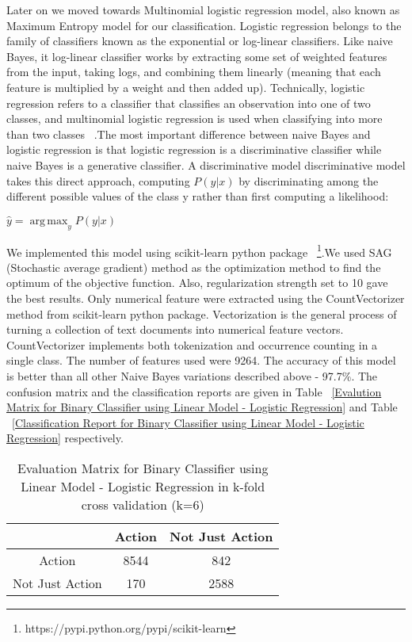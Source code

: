 \documentclass[11pt,letterpaper]{article}
\begin{document}
Later on we moved towards Multinomial logistic regression model, also known as Maximum Entropy model for our classification. Logistic regression belongs to the family of classifiers known as the exponential or log-linear classifiers. Like naive Bayes, it log-linear
classifier works by extracting some set of weighted features from the input, taking logs, and combining them linearly (meaning that each feature is multiplied by a weight and then added up). Technically, logistic regression refers to a classifier that classifies
an observation into one of two classes, and multinomial logistic regression is used when classifying into more than two classes ~\cite{jurafsky2000speech}.The most important difference between naive Bayes and logistic regression is that logistic regression is a discriminative classifier while naive Bayes is a generative
classifier.  A discriminative model discriminative
model takes this direct approach, computing $P(y|x)$ by discriminating among the different possible values of the class y rather than first computing a likelihood:

\begin{center}
 $\hat{y} = \operatorname*{arg\,max}_y P(y|x)$
\end{center}
We implemented this model using scikit-learn python package ~\footnote{https://pypi.python.org/pypi/scikit-learn}.We used SAG (Stochastic average gradient) method as the optimization method to find the optimum of the objective function. Also, regularization strength set to 10 gave the best results.  Only numerical feature were extracted using the CountVectorizer method from scikit-learn python package. Vectorization is the general process of turning a collection of text documents into numerical feature vectors. CountVectorizer implements both tokenization and occurrence counting in a single class. The number of features used were 9264. The accuracy of this model is better than all other Naive Bayes variations described above - 97.7\%. The confusion matrix and the classification reports are given in Table ~\ref{Evalution Matrix for Binary Classifier using  Linear Model - Logistic Regression} and Table ~\ref{Classification Report for Binary Classifier using  Linear Model - Logistic Regression} respectively.

\begin{table}
\caption{Evaluation Matrix for Binary Classifier using Linear Model - Logistic Regression in k-fold cross validation (k=6) } \label{Evalution Matrix for Binary Classifier using Linear Model - Logistic Regression}
\begin{center}
\begin{tabular}{ |c|c|c| } 
 \hline
  & Action & Not Just Action \\ 
 \hline
 Action & 8544 & 842 \\ 
 Not Just Action & 170 & 2588 \\ 
 \hline
\end{tabular}
\end{center}
\end{table}
\end{document}
